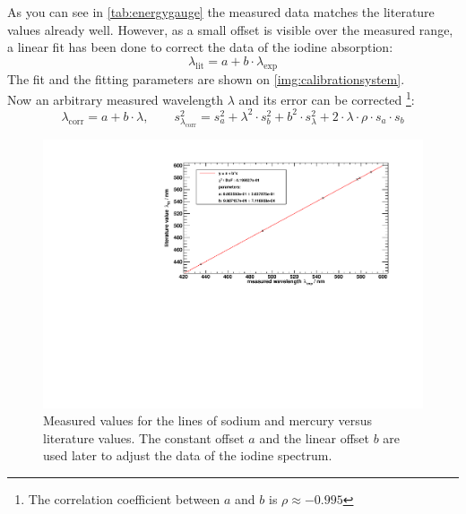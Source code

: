 As you can see in \autoref{tab:energygauge} the measured data matches the literature values already well.
However, as a small offset is visible over the measured range, a linear fit has been done
to correct the data of the iodine absorption:
\begin{equation}
  \lambda_{\text{lit}} = a + b \cdot \lambda_{\text{exp}}
\end{equation}
The fit and the fitting parameters are shown on \autoref{img:calibrationsystem}. \\
Now an arbitrary measured wavelength $\lambda$ and its error can be corrected \footnote{The correlation coefficient between $a$ and $b$ is $\rho \approx -0.995$}:
\begin{equation}
  \lambda_{\text{corr}} = a + b \cdot \lambda, \qquad s_{\lambda_{\text{corr}}}^2 = 
  s_a^2 + \lambda^2 \cdot s_b^2 + b^2 \cdot s_\lambda^2 + 2 \cdot \lambda \cdot \rho \cdot s_a \cdot s_b
\end{equation}

\begin{figure}[H]
\begin{center}
  \includegraphics[width=\textwidth]{../img/energy_gauge.pdf}
  \caption[---]{Measured values for the lines of sodium and mercury versus literature values.
  The constant offset $a$ and the linear offset $b$ are used later to adjust the data of the iodine spectrum.}
  \label{img:calibrationsystem}
\end{center}
\end{figure}

